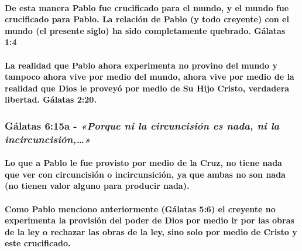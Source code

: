 \documentclass[11a pt,twoside]{article}
\newcommand{\scripture}[1]{%
  {\fontsize{12pt}{16pt}\selectfont\ScriptureFont\itshape #1}%
}
\let\oldsubsubsection\subsubsection
\renewcommand{\subsubsection}{\needspace{4\baselineskip}\oldsubsubsection}
\let\oldparagraph\paragraph
\renewcommand{\paragraph}{\needspace{3\baselineskip}\oldparagraph}
\begin{document}
\paragraph{De esta manera Pablo fue crucificado para el mundo, y el
mundo fue crucificado para Pablo. La relación de Pablo (y todo creyente)
con el mundo (el presente siglo) ha sido completamente quebrado. Gálatas
1:4}\label{de-esta-manera-pablo-fue-crucificado-para-el-mundo-y-el-mundo-fue-crucificado-para-pablo.-la-relaciuxf3n-de-pablo-y-todo-creyente-con-el-mundo-el-presente-siglo-ha-sido-completamente-quebrado.-guxe1latas-14}

\paragraph{La realidad que Pablo ahora experimenta no provino del mundo
y tampoco ahora vive por medio del mundo, ahora vive por medio de la
realidad que Dios le proveyó por medio de Su Hijo Cristo, verdadera
libertad. Gálatas
2:20.}\label{la-realidad-que-pablo-ahora-experimenta-no-provino-del-mundo-y-tampoco-ahora-vive-por-medio-del-mundo-ahora-vive-por-medio-de-la-realidad-que-dios-le-proveyuxf3-por-medio-de-su-hijo-cristo-verdadera-libertad.-guxe1latas-220.}

\subsubsection{\texorpdfstring{Gálatas 6:15a -
\scripture{«Porque ni la circuncisión es nada, ni la incircuncisión,…»}}{Gálatas 6:15a - }}\label{guxe1latas-615a---porque-ni-la-circuncisiuxf3n-es-nada-ni-la-incircuncisiuxf3n}

\paragraph{Lo que a Pablo le fue provisto por medio de la Cruz, no tiene
nada que ver con circuncisión o incircunsición, ya que ambas no son nada
(no tienen valor alguno para producir
nada).}\label{lo-que-a-pablo-le-fue-provisto-por-medio-de-la-cruz-no-tiene-nada-que-ver-con-circuncisiuxf3n-o-incircunsiciuxf3n-ya-que-ambas-no-son-nada-no-tienen-valor-alguno-para-producir-nada.}

\paragraph{Como Pablo menciono anteriormente (Gálatas 5:6) el creyente
no experimenta la provisión del poder de Dios por medio ir por las obras
de la ley o rechazar las obras de la ley, sino solo por medio de Cristo
y este
crucificado.}\label{como-pablo-menciono-anteriormente-guxe1latas-56-el-creyente-no-experimenta-la-provisiuxf3n-del-poder-de-dios-por-medio-ir-por-las-obras-de-la-ley-o-rechazar-las-obras-de-la-ley-sino-solo-por-medio-de-cristo-y-este-crucificado.}
\end{document}
